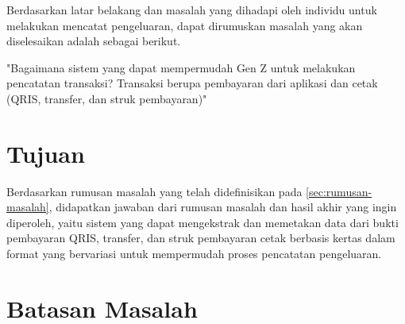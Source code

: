 Berdasarkan latar belakang dan masalah yang dihadapi oleh individu untuk melakukan mencatat pengeluaran, dapat dirumuskan masalah yang akan diselesaikan adalah sebagai berikut.

\begin{center}
	"Bagaimana sistem yang dapat mempermudah Gen Z untuk melakukan pencatatan transaksi? Transaksi berupa pembayaran dari aplikasi dan cetak (QRIS, transfer, dan struk pembayaran)"
\end{center}

\section{Tujuan}
\label{sec:tujuan}

Berdasarkan rumusan masalah yang telah didefinisikan pada \autoref{sec:rumusan-masalah}, didapatkan jawaban dari rumusan masalah dan hasil akhir yang ingin diperoleh, yaitu sistem yang dapat mengekstrak dan memetakan data dari bukti pembayaran QRIS, transfer, dan struk pembayaran cetak berbasis kertas dalam format yang bervariasi untuk mempermudah proses pencatatan pengeluaran.

\section{Batasan Masalah}
\label{sec:batasan-masalah}


